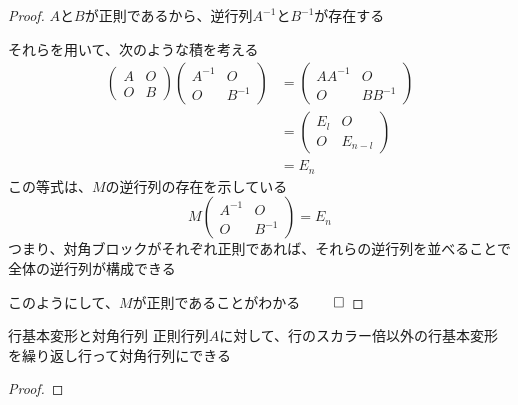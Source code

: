 \documentclass[../../../topic_linear-algebra]{subfiles}
\begin{document}
\begin{proof}
  $A$と$B$が正則であるから、逆行列$A^{-1}$と$B^{-1}$が存在する

  それらを用いて、次のような積を考える
  \begin{align*}
    \begin{pmatrix}
      A & O \\
      O & B
    \end{pmatrix} \begin{pmatrix}
                    A^{-1} & O      \\
                    O      & B^{-1}
                  \end{pmatrix} & = \begin{pmatrix}
                                      A A^{-1} & O        \\
                                      O        & B B^{-1}
                                    \end{pmatrix} \\
                                  & = \begin{pmatrix}
                                        E_l & O       \\
                                        O   & E_{n-l}
                                      \end{pmatrix}    \\
                                  & = E_n
  \end{align*}
  この等式は、$M$の逆行列の存在を示している
  \begin{equation*}
    M \begin{pmatrix}
      A^{-1} & O      \\
      O      & B^{-1}
    \end{pmatrix} = E_n
  \end{equation*}
  つまり、対角ブロックがそれぞれ正則であれば、それらの逆行列を並べることで全体の逆行列が構成できる

  このようにして、$M$が正則であることがわかる $\qed$
\end{proof}

\sectionline

\begin{theorem}{行基本変形と対角行列}
  正則行列$A$に対して、行のスカラー倍以外の行基本変形を繰り返し行って対角行列にできる
\end{theorem}

\begin{proof}
\end{proof}
\end{document}
